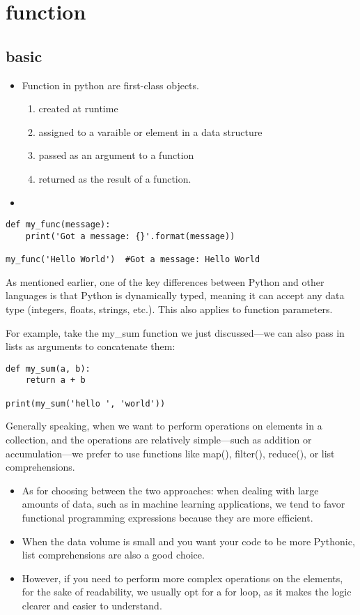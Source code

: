\documentclass[a4paper,12pt,twoside]{book}
\begin{document}
\chapter{function}
\section{basic}
\begin{itemize}
	\item Function in python are first-class objects.
	\begin{enumerate}
		\item created at runtime
		\item assigned to a varaible or element in a data structure
		\item passed as an argument to a function
		\item returned as the result of a function.
	\end{enumerate}
	\item 
\end{itemize}
\begin{lstlisting}
def my_func(message):
	print('Got a message: {}'.format(message))

my_func('Hello World')  #Got a message: Hello World
\end{lstlisting}

As mentioned earlier, one of the key differences between Python and other languages is that Python is dynamically typed, meaning it can accept any data type (integers, floats, strings, etc.). This also applies to function parameters.

For example, take the my\_sum function we just discussed—we can also pass in lists as arguments to concatenate them:
\begin{lstlisting}
def my_sum(a, b): 
	return a + b	
	
print(my_sum('hello ', 'world'))
\end{lstlisting}

Generally speaking, when we want to perform operations on elements in a collection, and the operations are relatively simple—such as addition or accumulation—we prefer to use functions like map(), filter(), reduce(), or list comprehensions.

\begin{itemize}
	\item As for choosing between the two approaches: when dealing with large amounts of data, such as in machine learning applications, we tend to favor functional programming expressions because they are more efficient. 
	
	\item When the data volume is small and you want your code to be more Pythonic, list comprehensions are also a good choice.
	
	\item However, if you need to perform more complex operations on the elements, for the sake of readability, we usually opt for a for loop, as it makes the logic clearer and easier to understand.
	
\end{itemize}
\end{document}
